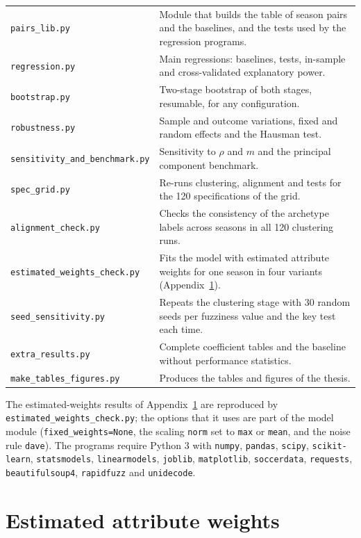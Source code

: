 \begin{table}[ht]
\begin{tabular}{p{4.6cm}p{10.2cm}}
		\texttt{pairs\_lib.py} & Module that builds the table of season pairs and the baselines, and the tests used by the regression programs. \\
		\texttt{regression.py} & Main regressions: baselines, tests, in-sample and cross-validated explanatory power. \\
		\texttt{bootstrap.py} & Two-stage bootstrap of both stages, resumable, for any configuration. \\
		\texttt{robustness.py} & Sample and outcome variations, fixed and random effects and the Hausman test. \\
		\texttt{sensitivity\_and\_benchmark.py} & Sensitivity to $\rho$ and $m$ and the principal component benchmark. \\
		\texttt{spec\_grid.py} & Re-runs clustering, alignment and tests for the 120 specifications of the grid. \\
		\texttt{alignment\_check.py} & Checks the consistency of the archetype labels across seasons in all 120 clustering runs. \\
		\texttt{estimated\_weights\_check.py} & Fits the model with estimated attribute weights for one season in four variants (Appendix~\ref{app:weights}). \\
		\texttt{seed\_sensitivity.py} & Repeats the clustering stage with 30 random seeds per fuzziness value and the key test each time. \\
		\texttt{extra\_results.py} & Complete coefficient tables and the baseline without performance statistics. \\
		\texttt{make\_tables\_figures.py} & Produces the tables and figures of the thesis. \\
		\bottomrule
	\end{tabular}
\end{table}

The estimated-weights results of Appendix~\ref{app:weights} are reproduced by \texttt{estimated\_weights\_check.py}; the options that it uses are part of the model module (\texttt{fixed\_weights=None}, the scaling \texttt{norm} set to \texttt{max} or \texttt{mean}, and the noise rule \texttt{dave}). The programs require Python 3 with \texttt{numpy}, \texttt{pandas}, \texttt{scipy}, \texttt{scikit-learn}, \texttt{statsmodels}, \texttt{linearmodels}, \texttt{joblib}, \texttt{matplotlib}, \texttt{soccerdata}, \texttt{requests}, \texttt{beautifulsoup4}, \texttt{rapidfuzz} and \texttt{unidecode}.

\chapter{Estimated attribute weights}
\label{app:weights}

